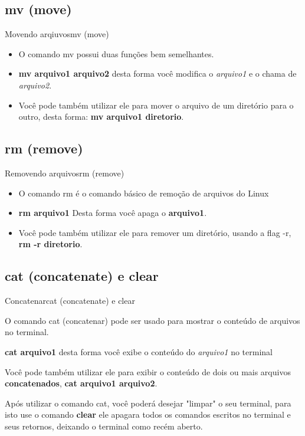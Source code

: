 \documentclass{beamer}
\begin{document}
\subsection{mv (move)}
\begin{frame}{Movendo arqiuvos}{mv (move)}
  \begin{itemize}
  \item {
    O comando mv possui duas fun\c{c}ões bem semelhantes.
    } 
    \item{ \textbf{mv arquivo1 arquivo2} desta forma você modifica o \textit{arquivo1} e o chama de \textit{arquivo2}.
    }
    \item{Você pode também utilizar ele para mover o arquivo de um diretório para o outro, desta forma: \textbf{mv arquivo1 diretorio}.
  }
  \end{itemize}
\end{frame}

\subsection{rm (remove)}
\begin{frame}{Removendo arquivos}{rm (remove)}
  \begin{itemize}
  \item {
    O comando rm é o comando básico de remoção de arquivos do Linux
    } 
    \item{ \textbf{rm arquivo1} Desta forma você apaga o \textbf{arquivo1}.
    }
    \item{Você pode também utilizar ele para remover um diretório, usando a flag -r, \textbf{rm -r diretorio}.
  }
 
  \end{itemize}
\end{frame}


\subsection{cat (concatenate) e clear}
\begin{frame}{Concatenar}{cat (concatenate) e clear}
  \begin{itemize}
  \item {   O comando cat (concatenar) pode ser usado para mostrar o conteúdo de arquivos no terminal.
   } 
    \item{ \textbf{cat arquivo1} desta forma você exibe o conteúdo do \textit{arquivo1} no terminal 
    }
    \item{Você pode também utilizar ele para exibir o conteúdo de dois ou mais arquivos \textbf{concatenados}, \textbf{cat arquivo1 arquivo2}.
    \item{Após utilizar o comando cat, você poderá desejar "limpar" o seu terminal, para isto use o comando \textbf{clear} ele apagara todos os comandos escritos no terminal e seus retornos, deixando o terminal como recém aberto.}
  }
  \end{itemize}
\end{frame}
\end{document}
